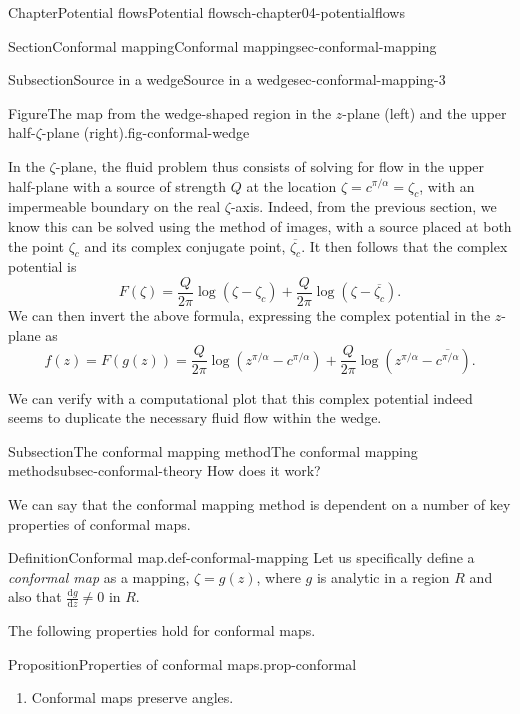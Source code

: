 \documentclass[oneside,10pt,]{book}
\numberwithin{equation}{section}
\newcommand{\de}{\mathrm{d}}
\newcommand{\dd}[2]{\frac{\de#1}{\de#2}}
\begin{document}
\begin{chapterptx}{Chapter}{Potential flows}{}{Potential flows}{}{}{ch-chapter04-potentialflows}
\begin{sectionptx}{Section}{Conformal mapping}{}{Conformal mapping}{}{}{sec-conformal-mapping}
\begin{subsectionptx}{Subsection}{Source in a wedge}{}{Source in a wedge}{}{}{sec-conformal-mapping-3}
\begin{figureptx}{Figure}{The map from the wedge-shaped region in the \(z\)-plane (left) and the upper half-\(\zeta\)-plane (right).}{fig-conformal-wedge}{}
\begin{image}{0}{1}{0}{}
\end{image}%
\tcblower
\end{figureptx}%
In the \(\zeta\)-plane, the fluid problem thus consists of solving for flow in the upper half-plane with a source of strength \(Q\) at the location \(\zeta = c^{\pi/\alpha} = \zeta_c\), with an impermeable boundary on the real \(\zeta\)-axis. Indeed, from the previous section, we know this can be solved using the method of images, with a source placed at both the point \(\zeta_c\) and its complex conjugate point, \(\overline{\zeta_c}\). It then follows that the complex potential is%
\begin{equation}
F(\zeta) = \frac{Q}{2\pi} \log(\zeta - \zeta_c) + \frac{Q}{2\pi} \log(\zeta - \overline{\zeta_c}).\label{eqn-conformal-zeta-wedge}
\end{equation}
We can then invert the above formula, expressing the complex potential in the \(z\)-plane as%
\begin{equation}
f(z) = F(g(z)) = \frac{Q}{2\pi} \log(z^{\pi/\alpha} - c^{\pi/\alpha}) + \frac{Q}{2\pi} \log(z^{\pi/\alpha} - \overline{c^{\pi/\alpha}}).\label{eqn-conformal-z-wedge}
\end{equation}
%
\par
We can verify with a computational plot that this complex potential indeed seems to duplicate the necessary fluid flow within the wedge.%
\end{subsectionptx}
%
%
\typeout{************************************************}
\typeout{************************************************}
%
\begin{subsectionptx}{Subsection}{The conformal mapping method}{}{The conformal mapping method}{}{}{subsec-conformal-theory}
How does it work?%
\par
We can say that the conformal mapping method is dependent on a number of key properties of conformal maps.%
\begin{definition}{Definition}{Conformal map.}{def-conformal-mapping}%
Let us specifically define a \emph{conformal map} as a mapping, \(\zeta = g(z)\), where \(g\) is analytic in a region \(R\) and also that \(\dd{g}{z} \neq 0\) in \(R\).%
\end{definition}
The following properties hold for conformal maps.%
\begin{proposition}{Proposition}{Properties of conformal maps.}{}{prop-conformal}%
%
\begin{enumerate}
\item{}Conformal maps preserve angles.%

\end{enumerate}
\end{proposition}
\end{subsectionptx}
\end{sectionptx}
\end{chapterptx}
\end{document}
